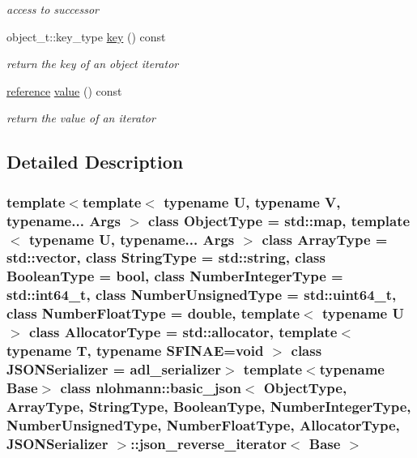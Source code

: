 \begin{DoxyCompactItemize}
\begin{DoxyCompactList}\small\item\em access to successor \end{DoxyCompactList}\item 
\mbox{\label{classnlohmann_1_1basic__json_1_1json__reverse__iterator_a26c551e1cee90ee52be00b5165804598}} 
object\+\_\+t\+::key\+\_\+type \hyperlink{classnlohmann_1_1basic__json_1_1json__reverse__iterator_a26c551e1cee90ee52be00b5165804598}{key} () const
\begin{DoxyCompactList}\small\item\em return the key of an object iterator \end{DoxyCompactList}\item 
\mbox{\label{classnlohmann_1_1basic__json_1_1json__reverse__iterator_af51506d91ecf911c97521e10a047c841}} 
\hyperlink{classnlohmann_1_1basic__json_1_1json__reverse__iterator_ab0021ef2007fd338615360af404dcd4e}{reference} \hyperlink{classnlohmann_1_1basic__json_1_1json__reverse__iterator_af51506d91ecf911c97521e10a047c841}{value} () const
\begin{DoxyCompactList}\small\item\em return the value of an iterator \end{DoxyCompactList}\end{DoxyCompactItemize}


\subsection{Detailed Description}
\subsubsection*{template$<$template$<$ typename U, typename V, typename... Args $>$ class Object\+Type = std\+::map, template$<$ typename U, typename... Args $>$ class Array\+Type = std\+::vector, class String\+Type = std\+::string, class Boolean\+Type = bool, class Number\+Integer\+Type = std\+::int64\+\_\+t, class Number\+Unsigned\+Type = std\+::uint64\+\_\+t, class Number\+Float\+Type = double, template$<$ typename U $>$ class Allocator\+Type = std\+::allocator, template$<$ typename T, typename S\+F\+I\+N\+A\+E=void $>$ class J\+S\+O\+N\+Serializer = adl\+\_\+serializer$>$\newline
template$<$typename Base$>$\newline
class nlohmann\+::basic\+\_\+json$<$ Object\+Type, Array\+Type, String\+Type, Boolean\+Type, Number\+Integer\+Type, Number\+Unsigned\+Type, Number\+Float\+Type, Allocator\+Type, J\+S\+O\+N\+Serializer $>$\+::json\+\_\+reverse\+\_\+iterator$<$ Base $>$}

